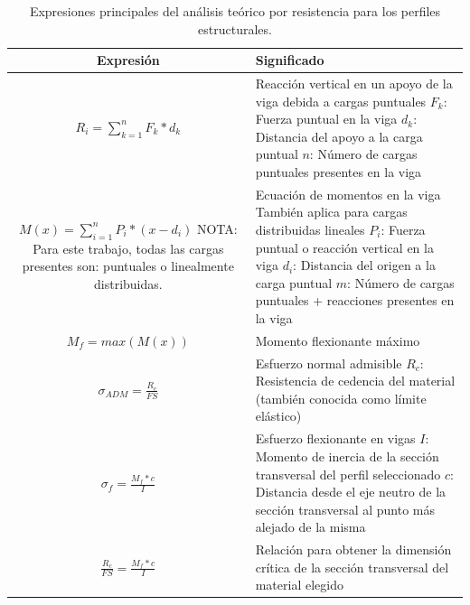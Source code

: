 \begin{table}[H]
  \centering
  \caption{Expresiones principales del análisis teórico por resistencia para los perfiles estructurales.}
    \begin{tabular}{|c|p{8cm}|}
    \hline
    \multicolumn{1}{|p{5cm}|}{\textbf{Expresión}} & \textbf{Significado} \\
    \hline \hline
    $ R_{i} = \sum _{k=1}^{n}F_{k}*d_{k} $ & Reacción vertical en un apoyo de la viga debida a cargas puntuales \newline{} $ F_k $: Fuerza puntual en la viga \newline{} $ d_k $: Distancia del apoyo a la carga puntual  \newline{} $ n $: Número de cargas puntuales presentes en la viga \\
    \hline
    \multicolumn{1}{|p{5cm}|}{$ M(x) = \sum _{i=1}^{n}P_{i}*(x-d_{i}) $ \newline{} NOTA: Para este trabajo, todas las cargas presentes son: puntuales o linealmente distribuidas.} & Ecuación de momentos en la viga \newline{} También aplica para cargas distribuidas lineales \newline{} $ P_i $: Fuerza puntual o reacción vertical en la viga \newline{} $ d_i $: Distancia del origen a la carga puntual  \newline{} $ m $: Número de cargas puntuales + reacciones presentes en la viga \\
    \hline
    $ M_f=max( M(x) ) $ & Momento flexionante máximo \\
    \hline
    $ \sigma_{ADM}= \frac{R_c}{FS} $ & Esfuerzo normal admisible \newline{} $ R_c $: Resistencia de cedencia del material (también conocida como límite elástico) \\
    \hline
    $ \sigma_f= \frac{M_f*c}{I} $ & Esfuerzo flexionante en vigas \newline{} $ I $: Momento de inercia de la sección transversal del perfil seleccionado \newline{} $ c $: Distancia desde el eje neutro de la sección transversal al punto más alejado de la misma \\
    \hline
    $ \frac{R_c}{FS} = \frac{M_f*c}{I} $ & Relación para obtener la dimensión crítica de la sección transversal del material elegido \\
    \hline
    \end{tabular}%
  \label{tab:expresiones_res}%
\end{table}%

